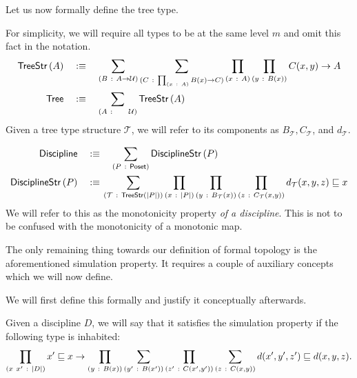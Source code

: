 Let us now formally define the tree type.
\begin{defn}
  For simplicity, we will require all types to be at the same level $m$ and omit this fact
  in the notation.
  \begin{align*}
    \treestr{A} &\quad\is\quad
      \sigmaty{B}{A \rightarrow \univ}{
        \sigmaty{C}{\pity{x}{A}{B(x) \rightarrow C}}{
          \pity{x}{A}{\pity{y}{B(x)}{C(x, y) \rightarrow A}}
        }
      }\\
    \mathsf{Tree} &\quad\is\quad \sigmaty{A}{~~~~\univ}{\treestr{A}}
  \end{align*}
  Given a tree type structure $\mathcal{T}$, we will refer to its components as
  $B_{\mathcal{T}}, C_{\mathcal{T}}$, and $d_{\mathcal{T}}$.
\end{defn}

\begin{defn}[Discipline]
  \begin{align*}
    \mathsf{Discipline} \quad&\is\quad \sigmaty{P}{\poset{}}{\disciplinestr{P}}                 \\
    \disciplinestr{P}   \quad&\is\quad \hspace{-0.9em}\sigmaty{\mathcal{T}}{\treestr{\abs{P}}}{
      \pity{x}{\abs{P}}{\pity{y}{B_{\mathcal{T}}(x)}{
          \pity{z}{C_{\mathcal{T}}(x, y)}{d_{\mathcal{T}}(x, y, z) \sqsubseteq x}}
      }
    }
  \end{align*}
  We will refer to this as the monotonicity property \emph{of a discipline}. This is not
  to be confused with the monotonicity of a monotonic map.
\end{defn}

The only remaining thing towards our definition of formal topology is the aforementioned
simulation property. It requires a couple of auxiliary concepts which we will now define.

We will first define this formally and justify it conceptually afterwards.
\begin{defn}
  Given a discipline $D$, we will say that it satisfies the simulation property if the
  following type is inhabited:
  \begin{equation*}
    \pity{x~x'}{\abs{D}}{
      x' \sqsubseteq x \rightarrow \pity{y}{B(x)}{
        \sigmaty{y'}{B(x')}{
          \pity{z'}{C(x', y')}{
            \sigmaty{z}{C(x, y)}{
              d(x', y', z') \sqsubseteq d(x, y, z)
            }
          }
        }
      }
    }.
  \end{equation*}
\end{defn}

